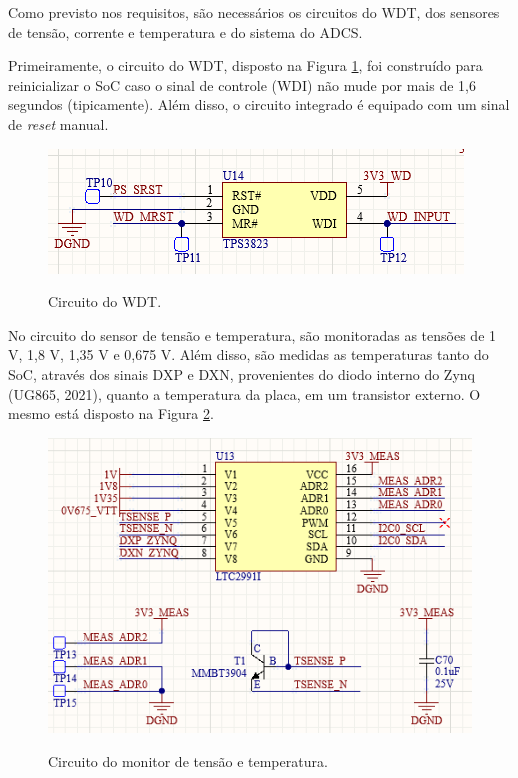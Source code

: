 Como previsto nos requisitos, são necessários os circuitos do WDT, dos sensores de tensão, corrente e temperatura e do sistema do ADCS. 

Primeiramente, o circuito do WDT, disposto na Figura \ref{fig:wdt}, foi construído para reinicializar o SoC caso o sinal de controle (WDI) não mude por mais de 1,6 segundos (tipicamente). Além disso, o circuito integrado é equipado com um sinal de \textit{reset} manual. 

\begin{figure}[H]
    \centering
    \caption{Circuito do WDT.}
    \includegraphics[scale=0.7]{images/wdt.png}
    \label{fig:wdt}
\end{figure}

No circuito do sensor de tensão e temperatura, são monitoradas as tensões de 1 V, 1,8 V, 1,35 V e  0,675 V. Além disso, são medidas as temperaturas tanto do SoC, através dos sinais DXP e DXN, provenientes do diodo interno do Zynq (UG865, 2021), quanto a temperatura da placa, em um transistor externo. O mesmo está disposto na Figura \ref{fig:sense}.

\begin{figure}[H]
    \centering
    \caption{Circuito do monitor de tensão e temperatura.}
    \includegraphics[scale=0.7]{images/sense.png}
    \label{fig:sense}
\end{figure}

